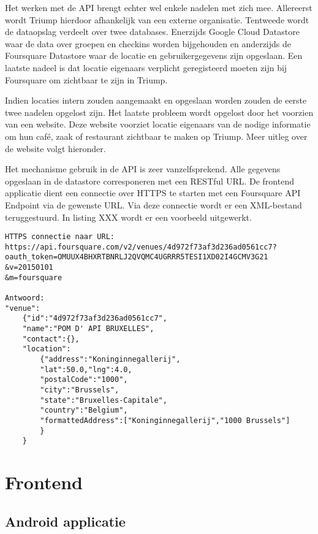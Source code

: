 Het werken met de API brengt echter wel enkele nadelen met zich mee.
Allereerst wordt Triump hierdoor afhankelijk van een externe organisatie. Tentweede wordt de dataopslag verdeelt over twee databases. Enerzijds Google Cloud Datastore waar de data over groepen en checkins worden bijgehouden en anderzijds de Foursquare Datastore waar de locatie en gebruikergegevens zijn opgeslaan. Een laatste nadeel is dat locatie eigenaars verplicht geregisteerd moeten zijn bij Foursquare om zichtbaar te zijn in Triump. 

Indien locaties intern zouden aangemaakt en opgeslaan worden zouden de eerste twee nadelen opgelost zijn. 
Het laatste probleem wordt opgelost door het voorzien van een website. Deze website voorziet locatie eigenaars van de nodige informatie om hun café, zaak of restaurant zichtbaar te maken op Triump. Meer uitleg over de website volgt hieronder.


Het mechanisme gebruik in de API is zeer vanzelfsprekend. Alle gegevens opgeslaan in de datastore corresponeren met een RESTful URL. De frontend applicatie dient een connectie over HTTPS te starten met een Foursquare API Endpoint via de gewenste URL. Via deze connectie wordt er een XML-bestand teruggestuurd. In listing XXX wordt er een voorbeeld uitgewerkt.

\begin{lstlisting}
HTTPS connectie naar URL:
https://api.foursquare.com/v2/venues/4d972f73af3d236ad0561cc7?
oauth_token=OMUUX4BHXRTBNRLJ2QVQMC4UGRRR5TESI1XD02I4GCMV3G21
&v=20150101
&m=foursquare

Antwoord:
"venue":
	{"id":"4d972f73af3d236ad0561cc7",
	"name":"POM D' API BRUXELLES",
	"contact":{},
	"location":
		{"address":"Koninginnegallerij",
		"lat":50.0,"lng":4.0,
		"postalCode":"1000",
		"city":"Brussels",
		"state":"Bruxelles-Capitale",
		"country":"Belgium",
		"formattedAddress":["Koninginnegallerij","1000 Brussels"]
		}
	}
\end{lstlisting}

 


\section{Frontend}
\subsection{Android applicatie}
